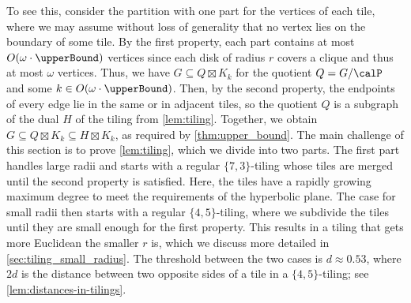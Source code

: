 To see this, consider the partition \calP with one part for the vertices of each tile, where we may assume without loss of generality that no vertex lies on the boundary of some tile.
By the first property, each part contains at most $ O(\omega \cdot \upperBound) $ vertices since each disk of radius $ r $ covers a clique and thus at most $ \omega $ vertices.
Thus, we have $ G \subseteq Q \boxtimes K_k $ for the quotient $ Q = G / \calP $ and some $ k \in {O(\omega \cdot \upperBound)} $.
Then, by the second property, the endpoints of every edge lie in the same or in adjacent tiles, so the quotient $ Q $ is a subgraph of the dual $ H $ of the tiling from \cref{lem:tiling}.
Together, we obtain $ G \subseteq Q \boxtimes K_k \subseteq H \boxtimes K_k $, as required by \cref{thm:upper_bound}.
%
The main challenge of this section is to prove \cref{lem:tiling}, which we divide into two parts.
The first part handles large radii and starts with a regular $ \{7, 3\} $-tiling whose tiles are merged until the second property is satisfied.
Here, the tiles have a rapidly growing maximum degree to meet the requirements of the hyperbolic plane.
The case for small radii then starts with a regular $ \{ 4, 5 \} $-tiling, where we subdivide the tiles until they are small enough for the first property.
This results in a tiling that gets more Euclidean the smaller $ r $ is, which we discuss more detailed in \cref{sec:tiling_small_radius}.
The threshold between the two cases is $ d \approx 0.53 $, where $ 2d $ is the distance between two opposite sides of a tile in a $ \{ 4, 5 \} $-tiling; see \cref{lem:distances-in-tilings}.
%
%
%
% 
%     
